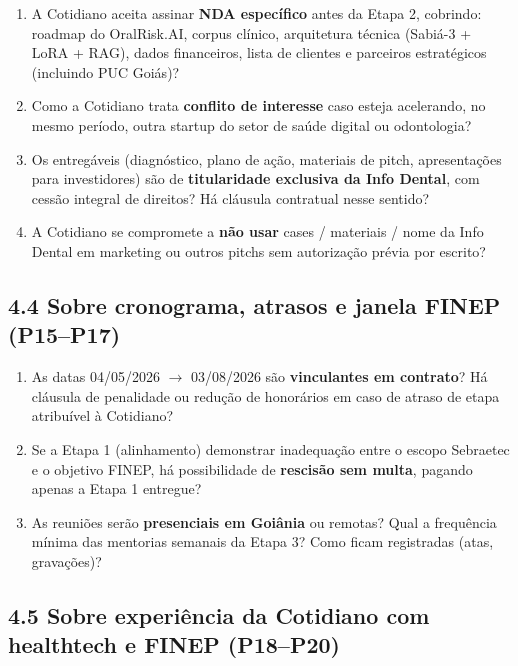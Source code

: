 \documentclass[11pt, a4paper]{article}
\begin{document}
\begin{enumerate}[label=\textcolor{primaryColor}{\textbf{P\arabic*.}}, leftmargin=2.2em, start=11]
    \item A Cotidiano aceita assinar \textbf{NDA específico} antes da Etapa 2, cobrindo: roadmap do OralRisk.AI, corpus clínico, arquitetura técnica (Sabiá-3 + LoRA + RAG), dados financeiros, lista de clientes e parceiros estratégicos (incluindo PUC Goiás)?
    \item Como a Cotidiano trata \textbf{conflito de interesse} caso esteja acelerando, no mesmo período, outra startup do setor de saúde digital ou odontologia?
    \item Os entregáveis (diagnóstico, plano de ação, materiais de pitch, apresentações para investidores) são de \textbf{titularidade exclusiva da Info Dental}, com cessão integral de direitos? Há cláusula contratual nesse sentido?
    \item A Cotidiano se compromete a \textbf{não usar} cases / materiais / nome da Info Dental em marketing ou outros pitchs sem autorização prévia por escrito?
\end{enumerate}

\subsection{4.4 Sobre cronograma, atrasos e janela FINEP (P15--P17)}

\begin{enumerate}[label=\textcolor{primaryColor}{\textbf{P\arabic*.}}, leftmargin=2.2em, start=15]
    \item As datas 04/05/2026 $\to$ 03/08/2026 são \textbf{vinculantes em contrato}? Há cláusula de penalidade ou redução de honorários em caso de atraso de etapa atribuível à Cotidiano?
    \item Se a Etapa 1 (alinhamento) demonstrar inadequação entre o escopo Sebraetec e o objetivo FINEP, há possibilidade de \textbf{rescisão sem multa}, pagando apenas a Etapa 1 entregue?
    \item As reuniões serão \textbf{presenciais em Goiânia} ou remotas? Qual a frequência mínima das mentorias semanais da Etapa 3? Como ficam registradas (atas, gravações)?
\end{enumerate}

\subsection{4.5 Sobre experiência da Cotidiano com healthtech e FINEP (P18--P20)}
\end{document}
